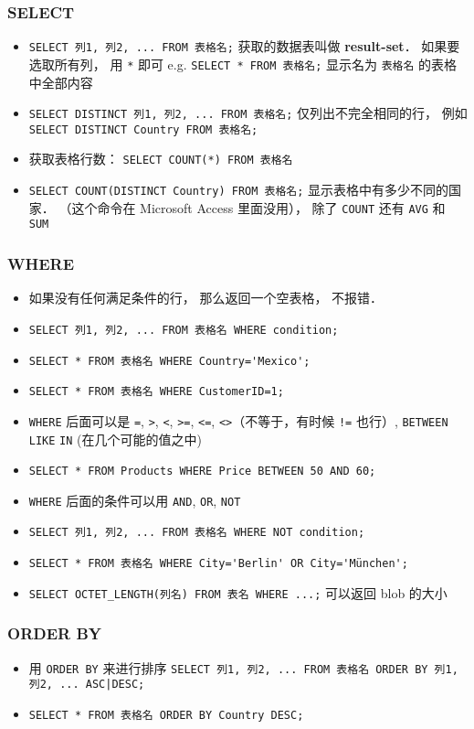 \subsubsection{SELECT}
\begin{itemize}
\item \verb`SELECT 列1, 列2, ... FROM 表格名;` 获取的数据表叫做 \textbf{result-set}． 如果要选取所有列， 用 \verb`*` 即可 e.g. \verb`SELECT * FROM 表格名;` 显示名为 \verb|表格名| 的表格中全部内容
\item \verb`SELECT DISTINCT 列1, 列2, ... FROM 表格名;` 仅列出不完全相同的行， 例如 \verb`SELECT DISTINCT Country FROM 表格名;`
\item 获取表格行数： \verb`SELECT COUNT(*) FROM 表格名`
\item \verb`SELECT COUNT(DISTINCT Country) FROM 表格名;` 显示表格中有多少不同的国家． （这个命令在 Microsoft Access 里面没用）， 除了 \verb|COUNT| 还有 \verb|AVG| 和 \verb|SUM|
\end{itemize}

\subsubsection{WHERE}
\begin{itemize}
\item 如果没有任何满足条件的行， 那么返回一个空表格， 不报错．
\item \verb`SELECT 列1, 列2, ... FROM 表格名 WHERE condition;`
\item \verb`SELECT * FROM 表格名 WHERE Country='Mexico';`
\item \verb`SELECT * FROM 表格名 WHERE CustomerID=1;`
\item \verb`WHERE` 后面可以是 \verb`=`, \verb`>`, \verb`<`, \verb`>=`, \verb`<=`, \verb`<>`（不等于，有时候 \verb`!=` 也行）, \verb`BETWEEN` \verb`LIKE` \verb`IN` (在几个可能的值之中)
\item \verb`SELECT * FROM Products WHERE Price BETWEEN 50 AND 60;`
\item \verb`WHERE` 后面的条件可以用 \verb`AND`, \verb`OR`, \verb`NOT`
\item \verb`SELECT 列1, 列2, ... FROM 表格名 WHERE NOT condition;`
\item \verb`SELECT * FROM 表格名 WHERE City='Berlin' OR City='München';`
\item \verb`SELECT OCTET_LENGTH(列名) FROM 表名 WHERE ...;` 可以返回 blob 的大小
\end{itemize}

\subsubsection{ORDER BY}
\begin{itemize}
\item 用 \verb`ORDER BY` 来进行排序 \verb`SELECT 列1, 列2, ... FROM 表格名 ORDER BY 列1, 列2, ... ASC|DESC;`
\item \verb`SELECT * FROM 表格名 ORDER BY Country DESC;`
\end{itemize}

